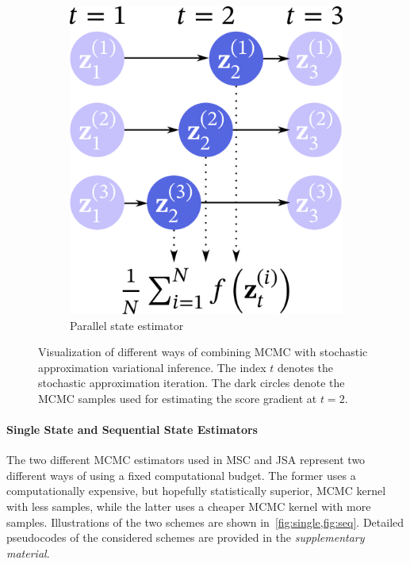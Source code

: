 \begin{figure}
\begin{subfigure}[b]{0.3\textwidth}
        \includegraphics[scale=0.25]{figures/diagram_3.png}
        \caption{Parallel state estimator}\label{fig:par}
    \end{subfigure}
    \caption{Visualization of different ways of combining MCMC with stochastic approximation variational inference.
    The index \(t\) denotes the stochastic approximation iteration.
    The dark circles denote the MCMC samples used for estimating the score gradient at \(t=2\).
    }\label{fig:overview}
\end{figure}

\vspace{-0.05in}
\paragraph{Single State and Sequential State Estimators}
The two different MCMC estimators used in MSC and JSA represent two different ways of using a fixed computational budget.
The former uses a computationally expensive, but hopefully statistically superior, MCMC kernel with less samples, while the latter uses a cheaper MCMC kernel with more samples.
Illustrations of the two schemes are shown in~\cref{fig:single,fig:seq}.
Detailed pseudocodes of the considered schemes are provided in the \textit{supplementary material}.

